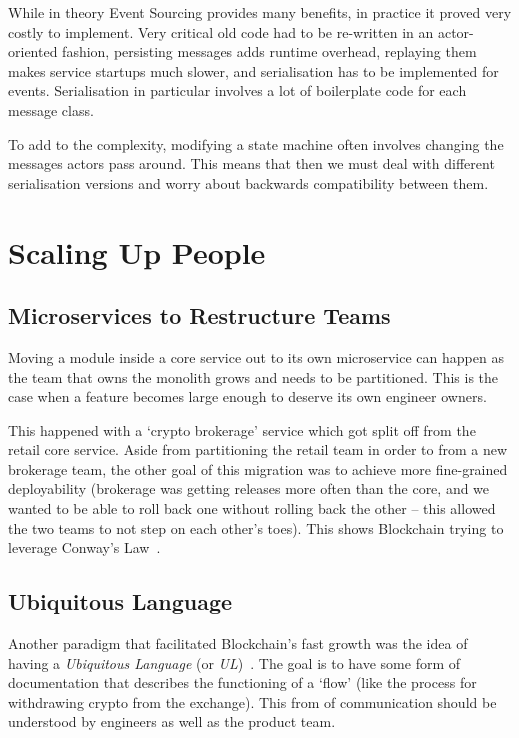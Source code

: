 \documentclass[conference]{IEEEtran}
\begin{document}
    While in theory Event Sourcing provides many benefits, in practice it proved very costly to
    implement.
    Very critical old code had to be re-written in an actor-oriented fashion, persisting messages
    adds runtime overhead, replaying them makes service startups much slower, and serialisation has
    to be implemented for events.
    Serialisation in particular involves a lot of boilerplate code for each message class.

    To add to the complexity, modifying a state machine often involves changing the messages actors
    pass around.
    This means that then we must deal with different serialisation versions and worry about
    backwards compatibility between them.
    \section{Scaling Up People}

    \subsection{Microservices to Restructure Teams}

    Moving a module inside a core service out to its own microservice can happen as the team that
    owns the monolith grows and needs to be partitioned.
    This is the case when a feature becomes large enough to deserve its own engineer owners.

    This happened with a `crypto brokerage' service which got split off from the retail core
    service.
    Aside from partitioning the retail team in order to from a new brokerage team, the other goal of
    this migration was to achieve more fine-grained deployability (brokerage was getting releases
    more often than the core, and we wanted to be able to roll back one without rolling back the
    other -- this allowed the two teams to not step on each other's toes).
    This shows Blockchain trying to leverage Conway's Law~\cite{conwayLaw}.\\

    \subsection{Ubiquitous Language}\label{subsec:ul}

    Another paradigm that facilitated Blockchain's fast growth was the idea of having a
    \emph{Ubiquitous Language} (or \emph{UL})~\cite{evansDomainDrivenDesignUL, fowlerUL}.
    The goal is to have some form of documentation that describes the functioning of a `flow' (like
    the process for withdrawing crypto from the exchange).
    This from of communication should be understood by engineers as well as the product team.
\end{document}
